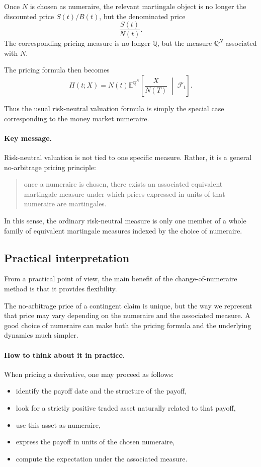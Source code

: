 \documentclass[11pt]{article}
\newcommand{\Qbb}{\mathbb{Q}}
\newcommand{\E}{\mathbb{E}}
\theoremstyle{definition}
\theoremstyle{plain}
\begin{document}
Once \(N\) is chosen as numeraire, the relevant martingale object is no
longer the discounted price \(S(t)/B(t)\), but the denominated price
\[
\frac{S(t)}{N(t)}.
\]
The corresponding pricing measure is no longer \(\Qbb\), but the
measure \(\Qbb^N\) associated with \(N\).

The pricing formula then becomes
\[
\Pi(t;X)
=
N(t)\E^{\Qbb^N}\!\left[
\frac{X}{N(T)}
\;\middle|\;
\mathcal{F}_t
\right].
\]

Thus the usual risk-neutral valuation formula is simply the special case
corresponding to the money market numeraire.

\paragraph{Key message.}
Risk-neutral valuation is not tied to one specific measure.
Rather, it is a general no-arbitrage pricing principle:
\begin{quote}
once a numeraire is chosen, there exists an associated equivalent
martingale measure under which prices expressed in units of that
numeraire are martingales.
\end{quote}

In this sense, the ordinary risk-neutral measure is only one member of a
whole family of equivalent martingale measures indexed by the choice of
numeraire.

\subsection{Practical interpretation}

From a practical point of view, the main benefit of the
change-of-numeraire method is that it provides flexibility.

The no-arbitrage price of a contingent claim is unique, but the way we
represent that price may vary depending on the numeraire and the
associated measure.
A good choice of numeraire can make both the pricing formula and the
underlying dynamics much simpler.

\paragraph{How to think about it in practice.}
When pricing a derivative, one may proceed as follows:
\begin{itemize}[leftmargin=1.4em]
\item identify the payoff date and the structure of the payoff,
\item look for a strictly positive traded asset naturally related to
that payoff,
\item use this asset as numeraire,
\item express the payoff in units of the chosen numeraire,
\item compute the expectation under the associated measure.
\end{itemize}
\end{document}
